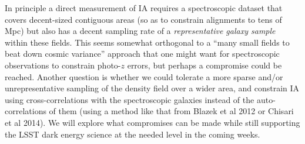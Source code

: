 In principle a direct measurement of IA requires a spectroscopic dataset that covers decent-sized
contiguous areas (so as to constrain alignments to tens of Mpc) but also has a decent sampling rate
of a {\em representative galaxy sample} within these fields.  This seems somewhat orthogonal to a
``many small fields to beat down cosmic variance'' approach that one might want for spectroscopic
observations to constrain photo-$z$ errors, but perhaps a compromise could be reached.  Another
question is whether we could tolerate a more sparse and/or unrepresentative sampling of the density
field over a wider area, and constrain IA using cross-correlations with the spectroscopic galaxies
instead of the auto-correlations of them (using a method like that from Blazek et al 2012 or Chisari
et al 2014).  We will explore what compromises can be made while still supporting the LSST dark
energy science at the needed level in the coming weeks.

